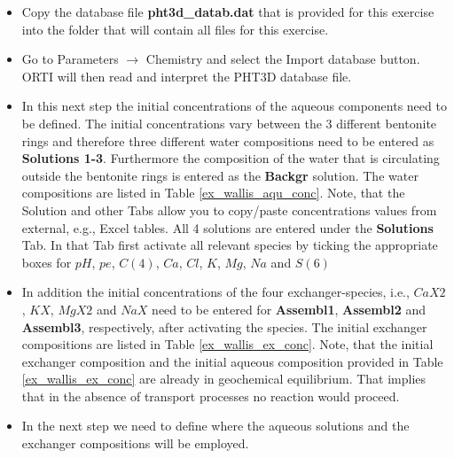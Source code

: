 \begin{itemize}

\item Copy the database file {\color{red} \textbf{pht3d\_datab.dat}} 
that is provided for this exercise 
into the folder that will contain all files for this exercise.

\item Go to {\color{blue}Parameters} $\rightarrow$ {\color{blue}Chemistry} and select the
{\color{blue}Import database} button. ORTI will then read and interpret 
the PHT3D database file.

\item In this next step the initial concentrations of the aqueous components need to be defined. 
The initial concentrations vary between the 3 different bentonite rings and therefore three different
water compositions need to be entered as {\color{red} \textbf{Solutions 1-3}}. 
Furthermore the composition of the water that is circulating 
outside the bentonite rings is entered as the {\color{red} \textbf{Backgr}} solution. 
The water compositions are listed in Table \ref{ex_wallis_aqu_conc}.
Note, that the {\color{blue}Solution} and other Tabs allow you to copy/paste 
concentrations values from external, e.g., Excel tables. 
All 4 solutions are entered under the {\color{blue} \textbf{Solutions}} Tab.
In that Tab first activate all relevant species by ticking the appropriate boxes for 
$pH$, $pe$,  $C(4)$, $Ca$, $Cl$, $K$, $Mg$, $Na$ and $S(6)$

\item In addition the initial concentrations of the four exchanger-species, i.e., $CaX2$, 
$KX$, $MgX2$ and $NaX$ need to be entered for {\color{red} \textbf{Assembl1}}, 
{\color{red} \textbf{Assembl2}} and {\color{red} \textbf{Assembl3}}, respectively,
after activating the species. 
The initial exchanger compositions are listed in Table \ref{ex_wallis_ex_conc}.
Note, that the initial exchanger composition and the initial aqueous composition 
provided in Table \ref{ex_wallis_ex_conc} are already in geochemical equilibrium.   
That implies that in the absence of transport processes no reaction would proceed.      

\item In the next step we need to define where the aqueous solutions 
and the exchanger compositions will be employed. 


\end{itemize}
